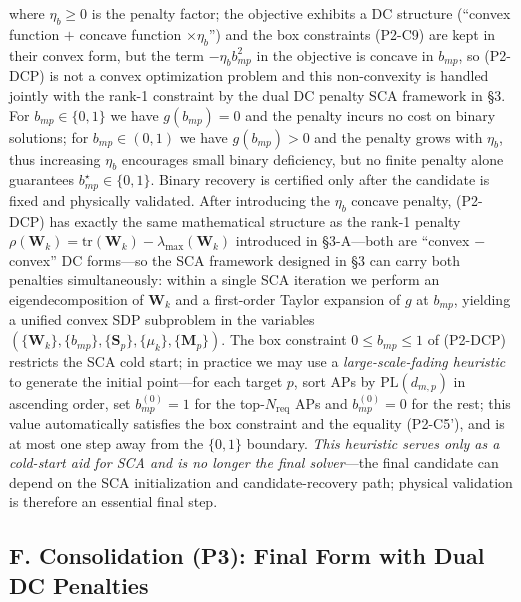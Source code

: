 \documentclass[12pt,a4paper]{article}
\newcommand{\mat}[1]{\mathbf{#1}}
\newcommand{\tr}{\text{tr}}
\begin{document}
where $\eta_b \geq 0$ is the penalty factor; the objective exhibits a DC structure (``convex function $+$ concave function $\times \eta_b$'') and the box constraints (P2-C9) are kept in their convex form, but the term $-\eta_b b_{mp}^2$ in the objective is concave in $b_{mp}$, so (P2-DCP) is not a convex optimization problem and this non-convexity is handled jointly with the rank-1 constraint by the dual DC penalty SCA framework in \S3. For $b_{mp} \in \{0,1\}$ we have $g(b_{mp}) = 0$ and the penalty incurs no cost on binary solutions; for $b_{mp} \in (0,1)$ we have $g(b_{mp}) > 0$ and the penalty grows with $\eta_b$, thus increasing $\eta_b$ encourages small binary deficiency, but no finite penalty alone guarantees $b_{mp}^\star\in\{0,1\}$. Binary recovery is certified only after the candidate is fixed and physically validated. After introducing the $\eta_b$ concave penalty, (P2-DCP) has exactly the same mathematical structure as the rank-1 penalty $\rho(\mat{W}_k) = \tr(\mat{W}_k) - \lambda_{\max}(\mat{W}_k)$ introduced in \S3-A---both are ``convex $-$ convex'' DC forms---so the SCA framework designed in \S3 can carry both penalties simultaneously: within a single SCA iteration we perform an eigendecomposition of $\mat{W}_k$ and a first-order Taylor expansion of $g$ at $b_{mp}$, yielding a unified convex SDP subproblem in the variables $(\{\mat{W}_k\}, \{b_{mp}\}, \{\mat{S}_p\}, \{\mu_k\}, \{\mat{M}_p\})$. The box constraint $0 \leq b_{mp} \leq 1$ of (P2-DCP) restricts the SCA cold start; in practice we may use a \emph{large-scale-fading heuristic} to generate the initial point---for each target $p$, sort APs by $\text{PL}(d_{m,p})$ in ascending order, set $b_{mp}^{(0)} = 1$ for the top-$N_{\text{req}}$ APs and $b_{mp}^{(0)} = 0$ for the rest; this value automatically satisfies the box constraint and the equality (P2-C5'), and is at most one step away from the $\{0,1\}$ boundary. \emph{This heuristic serves only as a cold-start aid for SCA and is no longer the final solver}---the final candidate can depend on the SCA initialization and candidate-recovery path; physical validation is therefore an essential final step.

\subsection*{F. Consolidation (P3): Final Form with Dual DC Penalties}
\end{document}
